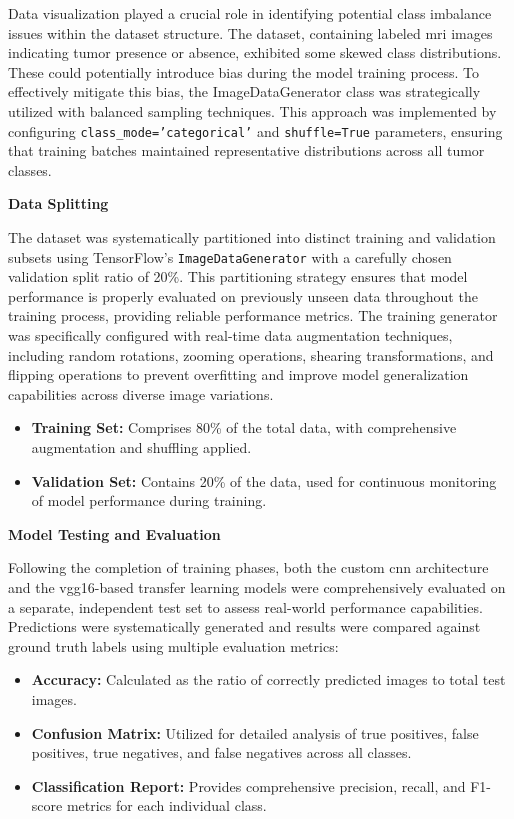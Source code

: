 Data visualization played a crucial role in identifying potential class
imbalance issues within the dataset structure. The dataset, containing labeled
\gls{mri} images indicating tumor presence or absence, exhibited some skewed
class distributions. These could potentially introduce bias during the model
training process. To effectively mitigate this bias, the ImageDataGenerator
class was strategically utilized with balanced sampling techniques. This
approach was implemented by configuring \texttt{class\_mode='categorical'} and
\texttt{shuffle=True} parameters, ensuring that training batches maintained
representative distributions across all tumor classes.

\textbf{Data Splitting}

The dataset was systematically partitioned into distinct training and
validation subsets using TensorFlow's \texttt{ImageDataGenerator} with a
carefully chosen validation split ratio of 20\%. This partitioning strategy
ensures that model performance is properly evaluated on previously unseen data
throughout the training process, providing reliable performance metrics. The
training generator was specifically configured with real-time data augmentation
techniques, including random rotations, zooming operations, shearing
transformations, and flipping operations to prevent overfitting and improve
model generalization capabilities across diverse image variations.

\begin{itemize}
    \item \textbf{Training Set:} Comprises 80\% of the total data, with comprehensive augmentation and shuffling applied.
    \item \textbf{Validation Set:} Contains 20\% of the data, used for continuous monitoring of model performance during training.
\end{itemize}

\textbf{Model Testing and Evaluation}

Following the completion of training phases, both the custom \gls{cnn}
architecture and the \gls{vgg16}-based transfer learning models were
comprehensively evaluated on a separate, independent test set to assess
real-world performance capabilities. Predictions were systematically generated
and results were compared against ground truth labels using multiple evaluation
metrics:

\begin{itemize}
    \item \textbf{Accuracy:} Calculated as the ratio of correctly predicted images to total test images.
    \item \textbf{Confusion Matrix:} Utilized for detailed analysis of true positives, false positives, true negatives, and false negatives across all classes.
    \item \textbf{Classification Report:} Provides comprehensive precision, recall, and F1-score metrics for each individual class.
\end{itemize}

